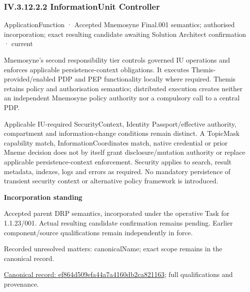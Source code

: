 \subsubsection*{IV.3.12.2.2 InformationUnit Controller}
\label{navigation:IV.3.12.2.2}

\label{element:ef864d509efa44a7a4160db2ca821163}
{\small ApplicationFunction · Accepted Mnemosyne Final.001 semantics; authorised incorporation; exact resulting candidate awaiting Solution Architect confirmation · current}\par

Mnemosyne's second responsibility tier controls governed IU operations and enforces applicable persistence-context obligations. It executes Themis-provided/enabled PDP and PEP functionality locally where required. Themis retains policy and authorisation semantics; distributed execution creates neither an independent Mnemosyne policy authority nor a compulsory call to a central PDP.



Applicable IU-required SecurityContext, Identity Passport/effective authority, compartment and information-change conditions remain distinct. A TopicMask capability match, InformationCoordinates match, native credential or prior Mneme decision does not by itself grant disclosure/mutation authority or replace applicable persistence-context enforcement. Security applies to search, result metadata, indexes, logs and errors as required. No mandatory persistence of transient security context or alternative policy framework is introduced.



\par\medskip\textbf{Incorporation standing}\par


Accepted parent DRP semantics, incorporated under the operative Task for 1.1.23/001. Actual resulting candidate confirmation remains pending. Earlier component/source qualifications remain independently in force.


{\small Recorded unresolved matters: canonicalName; exact scope remains in the canonical record.}\par
{\footnotesize \href{../../../../continuum/application/application-function/ef864d509efa44a7a4160db2ca821163.md}{Canonical record: ef864d509efa44a7a4160db2ca821163}; full qualifications and provenance.}\par
